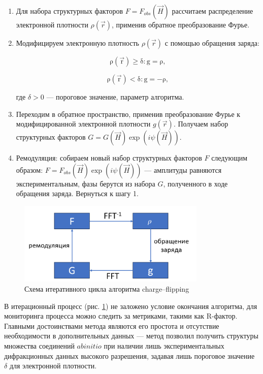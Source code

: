 \begin{enumerate}
	\item Для набора структурных факторов $F = F_{obs}(\overrightarrow{H})$ рассчитаем распределение электронной плотности $\rho(\overrightarrow{r})$, применив обратное преобразование Фурье.
	\item Модифицируем электронную плотность $\rho(\overrightarrow{r})$ с помощью обращения заряда:
	
	\begin{equation}
		\mathrm{\rho(\overrightarrow{r})\geq \delta: g = \rho,}
	\end{equation}
	
	\begin{equation}
	\mathrm{\rho(\overrightarrow{r})<\delta: g = -\rho,}
	\end{equation}
		
	где $\delta > 0$ --- пороговое значение, параметр алгоритма.
	\item Переходим в обратное пространство, применив преобразование Фурье к модифицированной электронной плотности $g(\overrightarrow{r})$. Получаем набор структурных факторов $G = G(\overrightarrow{H})\exp(i\psi(\overrightarrow{H}))$.
	\item Ремодуляция: собираем новый набор структурных факторов $F$ следующим образом: $F = F_{obs}(\overrightarrow{H})\exp(i\psi(\overrightarrow{H}))$ --- амплитуды равняются экспериментальным, фазы берутся из набора $G$, полученного в ходе обращения заряда. Вернуться к шагу 1.
\end{enumerate}

\begin{figure}[H]
	\centering
	\includegraphics[width=0.8\textwidth]{figures/charge-flip.png}\hfill
	\caption{Схема итеративного цикла алгоритма charge--flipping}
	\label{chfl}
\end{figure}

В итерационный процесс (рис. \ref{chfl}) не заложено условие окончания алгоритма, для мониторинга процесса можно следить за метриками, такими как R-фактор. Главными достоинствами метода являются его простота и отсутствие необходимости в дополнительных данных --- метод позволил получить структуры множества соединений $ab initio$ при наличии лишь экспериментальных дифракционных данных высокого разрешения, задавая лишь пороговое значение $\delta$ для электронной плотности.

